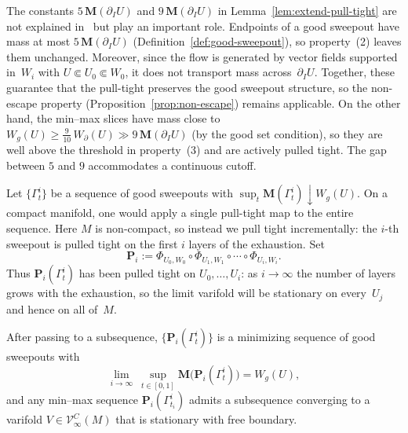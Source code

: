 \begin{remark}\label{rem:thresholds}
The constants $5\,\mathbf{M}(\partial_IU)$ and $9\,\mathbf{M}(\partial_IU)$ in Lemma~\ref{lem:extend-pull-tight} are not explained in~\cite{CL20} but play an important role. Endpoints of a good sweepout have mass at most $5\,\mathbf{M}(\partial_IU)$ (Definition~\ref{def:good-sweepout}), so property~(2) leaves them unchanged. Moreover, since the flow is generated by vector fields supported in~$W_i$ with $U\Subset U_0\Subset W_0$, it does not transport mass across~$\partial_IU$. Together, these guarantee that the pull-tight preserves the good sweepout structure, so the non-escape property (Proposition~\ref{prop:non-escape}) remains applicable. On the other hand, the min--max slices have mass close to $W_g(U)\ge\tfrac{9}{10}\,W_\partial(U)\gg 9\,\mathbf{M}(\partial_IU)$ (by the good set condition), so they are well above the threshold in property~(3) and are actively pulled tight. The gap between $5$ and $9$ accommodates a continuous cutoff.
\end{remark}

Let $\{\Gamma_t^i\}$ be a sequence of good sweepouts with $\sup_t \mathbf{M}(\Gamma_t^i)\downarrow W_g(U)$. On a compact manifold, one would apply a single pull-tight map to the entire sequence. Here $M$ is non-compact, so instead we pull tight incrementally: the $i$-th sweepout is pulled tight on the first $i$ layers of the exhaustion. Set
\[
\mathbf{P}_i:=\Phi_{U_0,W_0}\circ\Phi_{U_1,W_1}\circ\cdots\circ\Phi_{U_i,W_i}.
\]
Thus $\mathbf{P}_i(\Gamma_t^i)$ has been pulled tight on $U_0,\ldots,U_i$: as $i\to\infty$ the number of layers grows with the exhaustion, so the limit varifold will be stationary on every~$U_j$ and hence on all of~$M$.

\begin{proposition}\label{prop:pt-minimizing}
After passing to a subsequence, $\{\mathbf{P}_i(\Gamma_t^i)\}$ is a minimizing sequence of good sweepouts with
\[
\lim_{i\to\infty}\ \sup_{t\in[0,1]}\mathbf{M}\bigl(\mathbf{P}_i(\Gamma_t^i)\bigr)=W_g(U),
\]
and any min--max sequence $\mathbf{P}_i(\Gamma_{t_i}^i)$ admits a subsequence converging to a varifold $V\in\mathcal{V}^C_\infty(M)$ that is stationary with free boundary.
\end{proposition}

